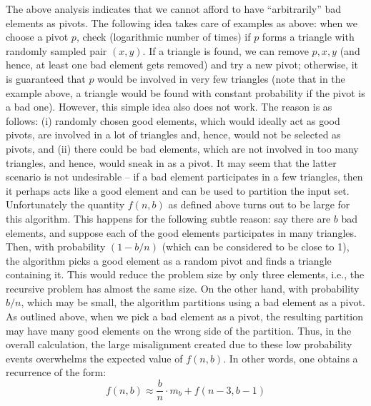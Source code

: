 \documentclass[11pt]{llncs}
\begin{document}
The above analysis indicates that we cannot afford to have ``arbitrarily'' bad elements as pivots. The following idea takes care of examples as above: when we choose a pivot $p$, check (logarithmic number of times)  if $p$ forms a triangle with randomly sampled pair $(x,y)$. If a triangle is found, we can remove $p, x, y$ (and hence, at least one bad element gets removed) and try a new pivot; otherwise, it is guaranteed that $p$ would be involved in very few triangles (note that in the example above, a triangle would be found with constant probability if the pivot is a bad one).  However, this simple idea also does not work. The reason is as follows: (i) randomly chosen good elements, which would ideally act as good pivots, are involved in a lot of triangles and, hence, would not be selected as pivots, and (ii) there could be bad elements, which are not involved in too many triangles, and hence, would sneak in as a pivot. It may seem that the latter scenario is not undesirable  -- if a bad element participates in a few triangles, then it perhaps acts like a good element and can be used to partition the input set. Unfortunately the quantity $f(n,b)$ as defined above turns out to be large for this algorithm.  This happens for the following subtle reason: say there are $b$ bad elements, and suppose each of the good elements participates in many triangles. Then, with probability $(1-b/n)$ (which can be considered to be close to 1), the algorithm picks a good element as a random pivot and finds a triangle containing it. This would reduce the problem size by only three elements, i.e., the recursive problem has almost the same size. On the other hand, with probability $b/n$, which may be small, the algorithm partitions using a bad element as a pivot. As outlined above, when we pick a bad element as a pivot, the resulting partition may have many good elements on the wrong side of the partition. Thus, in the overall calculation, the large misalignment created due to these low probability events overwhelms the expected value of $f(n,b)$. In other words, one obtains a recurrence of the form: 
$$f(n,b) \approx \frac{b}{n} \cdot m_b + f(n-3,b-1)$$
\end{document}

